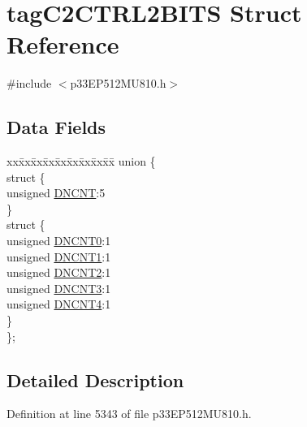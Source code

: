 \hypertarget{structtag_c2_c_t_r_l2_b_i_t_s}{}\section{tag\+C2\+C\+T\+R\+L2\+B\+I\+TS Struct Reference}
\label{structtag_c2_c_t_r_l2_b_i_t_s}


{\ttfamily \#include $<$p33\+E\+P512\+M\+U810.\+h$>$}

\subsection*{Data Fields}
\begin{DoxyCompactItemize}
\item 
\begin{tabbing}
xx\=xx\=xx\=xx\=xx\=xx\=xx\=xx\=xx\=\kill
union \{\\
\>struct \{\\
\>\>unsigned \hyperlink{structtag_c2_c_t_r_l2_b_i_t_s_ac95b93c4e5b0b451c30d758414b2faa6}{DNCNT}:5\\
\>\} \\
\>struct \{\\
\>\>unsigned \hyperlink{structtag_c2_c_t_r_l2_b_i_t_s_ae3204f0416c5ee268b1bacbc668b0c06}{DNCNT0}:1\\
\>\>unsigned \hyperlink{structtag_c2_c_t_r_l2_b_i_t_s_af8a600830557fb9feb4577ece303933b}{DNCNT1}:1\\
\>\>unsigned \hyperlink{structtag_c2_c_t_r_l2_b_i_t_s_a1a347041cec37b585f3e4809f26e742b}{DNCNT2}:1\\
\>\>unsigned \hyperlink{structtag_c2_c_t_r_l2_b_i_t_s_aefe3e090728f03e982e016058f54196e}{DNCNT3}:1\\
\>\>unsigned \hyperlink{structtag_c2_c_t_r_l2_b_i_t_s_afeca93a17ca8b9136cf43834d3c30f1e}{DNCNT4}:1\\
\>\} \\
\}; \\

\end{tabbing}\end{DoxyCompactItemize}


\subsection{Detailed Description}


Definition at line 5343 of file p33\+E\+P512\+M\+U810.\+h.



